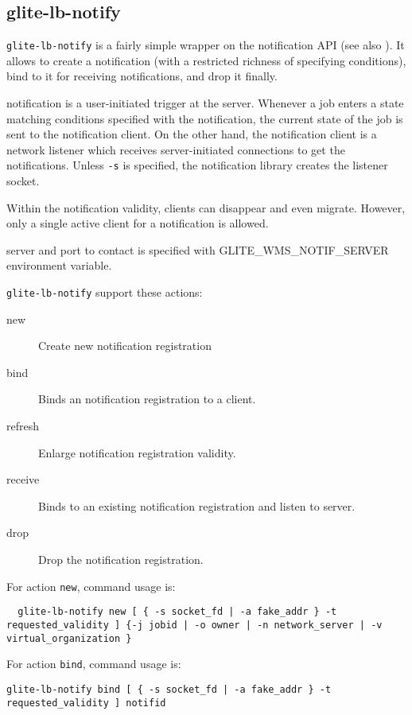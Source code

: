 \subsection{glite-lb-notify}
\label{s:lb-notify}

\verb'glite-lb-notify' is a fairly simple wrapper on the \LB notification API
(see also \cite{lbdg}).
It allows to create a notification (with a restricted richness of specifying 
conditions), bind to it for receiving notifications, and drop it finally.

\LB notification is a user-initiated trigger at the server.
Whenever a job enters a state matching conditions specified with the notification,
the current state of the job is sent to the notification client.
On the other hand, the notification client is a network listener
which receives server-initiated connections to get the notifications.
Unless \verb'-s' is specified, the notification library creates the listener
socket.

Within the notification validity, clients can disappear and even migrate.
However, only a single active client for a notification is allowed.

\LB server and port to contact is specified with GLITE\_WMS\_NOTIF\_SERVER 
environment variable.

\verb'glite-lb-notify' support these actions:
\begin{description}
\item[new] Create new notification registration
\item[bind]  Binds an notification registration to a client.
\item[refresh]  Enlarge notification registration validity.
\item[receive]  Binds to an existing notification registration and listen to server.
\item[drop]     Drop the notification registration.
\end{description}

For action \verb'new', command usage is:

\begin{verbatim}
  glite-lb-notify new [ { -s socket_fd | -a fake_addr } -t requested_validity ] {-j jobid | -o owner | -n network_server | -v virtual_organization }
\end{verbatim}

For action \verb'bind', command usage is:
\begin{verbatim}
glite-lb-notify bind [ { -s socket_fd | -a fake_addr } -t requested_validity ] notifid
\end{verbatim}

